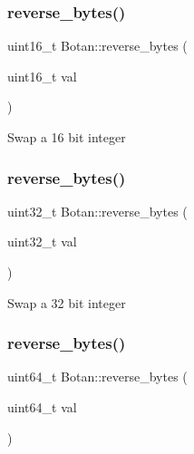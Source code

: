 \subsubsection{\texorpdfstring{reverse\+\_\+bytes()}{reverse\_bytes()}\hspace{0.1cm}{\footnotesize\ttfamily [1/3]}}
{\footnotesize\ttfamily uint16\+\_\+t Botan\+::reverse\+\_\+bytes (\begin{DoxyParamCaption}\item[{uint16\+\_\+t}]{val }\end{DoxyParamCaption})\hspace{0.3cm}{\ttfamily [inline]}}

Swap a 16 bit integer \mbox{\label{namespace_botan_a5c0e57eb245139c321b18d1d242c9e9f}} 
\subsubsection{\texorpdfstring{reverse\+\_\+bytes()}{reverse\_bytes()}\hspace{0.1cm}{\footnotesize\ttfamily [2/3]}}
{\footnotesize\ttfamily uint32\+\_\+t Botan\+::reverse\+\_\+bytes (\begin{DoxyParamCaption}\item[{uint32\+\_\+t}]{val }\end{DoxyParamCaption})\hspace{0.3cm}{\ttfamily [inline]}}

Swap a 32 bit integer \mbox{\label{namespace_botan_ae04de07006f5cfa825328813ea7d3985}} 
\subsubsection{\texorpdfstring{reverse\+\_\+bytes()}{reverse\_bytes()}\hspace{0.1cm}{\footnotesize\ttfamily [3/3]}}
{\footnotesize\ttfamily uint64\+\_\+t Botan\+::reverse\+\_\+bytes (\begin{DoxyParamCaption}\item[{uint64\+\_\+t}]{val }\end{DoxyParamCaption})\hspace{0.3cm}{\ttfamily [inline]}}

